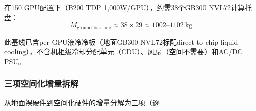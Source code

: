 在150 GPU配置下（B200 TDP 1,000W/GPU），约需38个GB300 NVL72计算托盘：
\begin{equation}
  M_{\text{ground baseline}} \approx 38 \times 29 \approx 1002\text{--}1102\ \text{kg}
\end{equation}

此基线已含per-GPU液冷冷板（地面GB300 NVL72标配direct-to-chip liquid cooling），不含机柜级冷却分配单元（CDU）、风扇（空间不需要）和AC/DC PSU。

\subsubsection{三项空间化增量拆解}

从地面裸硬件到空间化硬件的增量分解为三项（逐
